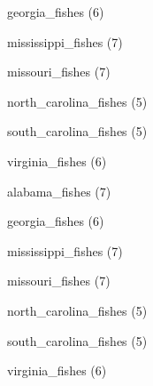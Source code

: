 \documentclass[11pt]{article}
\begin{document}
\begin{multicols}{2}
\vspace{1\baselineskip}

georgia\_fishes (6)

\vspace{1\baselineskip}

mississippi\_fishes (7)

\vspace{1\baselineskip}

missouri\_fishes (7)

\vspace{1\baselineskip}

north\_carolina\_fishes (5)

\vspace{1\baselineskip}

south\_carolina\_fishes (5)

\vspace{1\baselineskip}

virginia\_fishes (6)

\vspace{1\baselineskip}

alabama\_fishes (7)

\vspace{1\baselineskip}

georgia\_fishes (6)

\vspace{1\baselineskip}

mississippi\_fishes (7)

\vspace{1\baselineskip}

missouri\_fishes (7)

\vspace{1\baselineskip}

north\_carolina\_fishes (5)

\vspace{1\baselineskip}

south\_carolina\_fishes (5)

\vspace{1\baselineskip}

virginia\_fishes (6)

\end{multicols}
\end{document}
